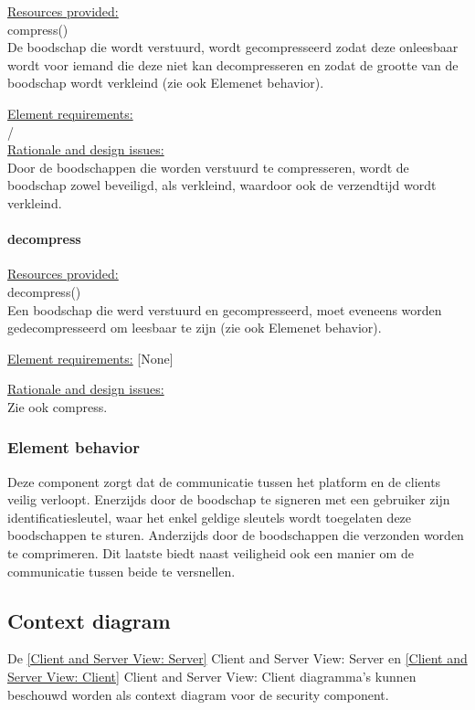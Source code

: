 \documentclass[a4paper,10pt]{article}
\begin{document}
\underline{Resources provided:}\\
compress()\\
De boodschap die wordt verstuurd, wordt gecompresseerd zodat deze onleesbaar wordt voor iemand die deze niet kan decompresseren en zodat de grootte van de boodschap wordt verkleind  (zie ook Elemenet behavior).

\underline{Element requirements:}\\
/\\

\underline{Rationale and design issues:}\\
Door de boodschappen die worden verstuurd te compresseren, wordt de boodschap zowel beveiligd, als verkleind, waardoor ook de verzendtijd wordt verkleind.\\

\paragraph{decompress}

\underline{Resources provided:}\\
decompress()\\
Een boodschap die werd verstuurd en gecompresseerd, moet eveneens worden gedecompresseerd om leesbaar te zijn (zie ook Elemenet behavior).

\underline{Element requirements:}
[None]

\underline{Rationale and design issues:}\\
Zie ook compress.\\

\subsubsection{Element behavior}
Deze component zorgt dat de communicatie tussen het platform en de clients veilig verloopt. Enerzijds door de boodschap te signeren met een gebruiker zijn identificatiesleutel, waar het enkel geldige sleutels wordt toegelaten deze boodschappen te sturen. Anderzijds door de boodschappen die verzonden worden te comprimeren. Dit laatste biedt naast veiligheid ook een manier om de communicatie tussen beide te versnellen.\\

\subsection{Context diagram}
De \ref{Client and Server View: Server} Client and Server View: Server en \ref{Client and Server View: Client} Client and Server View: Client diagramma's kunnen beschouwd worden als context diagram voor de security component.
\end{document}
